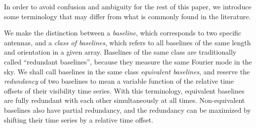 \documentclass[twocolumn,apj,numberedappendix]{emulateapj}
\renewcommand\[{\begin{equation}}
\renewcommand\]{\end{equation}}
\begin{document}
In order to avoid confusion and ambiguity for the rest of this paper, we
introduce some terminology that may differ from what is commonly found in the literature. 

We make the distinction between a \textit{baseline}, which corresponds to two specific antennas, and a \textit{class of baselines}, which refers to all baselines of the same length and orientation in a given array. 
Baselines of the same class are traditionally called
``redundant baselines'', because they measure the same Fourier mode
in the sky.  We shall call baselines in the same class \textit{equivalent baselines}, and reserve the \textit{redundancy} of two baselines to mean a variable function of the relative time offsets of their visibility time series. With this terminology, equivalent
baselines are fully redundant with each other simultaneously at all
times. Non-equivalent baselines also have partial redundancy, and the redundancy can be maximized 
by shifting their time series by a relative time offset.
\end{document}
